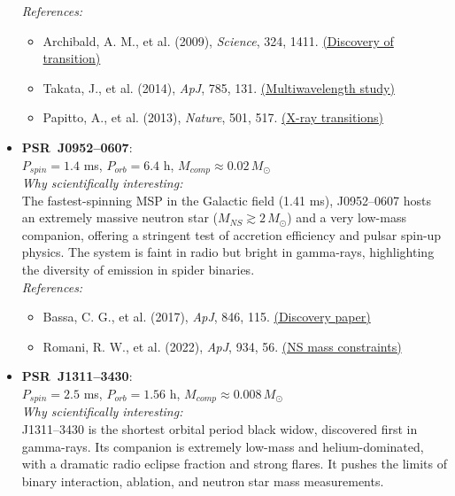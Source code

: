 \documentclass[12pt]{article}
\begin{document}
\begin{itemize}
    \textit{References:}
    \begin{itemize}
        \item Archibald, A. M., et al. (2009), \textit{Science}, 324, 1411. \href{https://www.science.org/doi/10.1126/science.1172740}{(Discovery of transition)}
        \item Takata, J., et al. (2014), \textit{ApJ}, 785, 131. \href{https://iopscience.iop.org/article/10.1088/0004-637X/785/2/131}{(Multiwavelength study)}
        \item Papitto, A., et al. (2013), \textit{Nature}, 501, 517. \href{https://www.nature.com/articles/nature12470}{(X-ray transitions)}
    \end{itemize}
    \vspace{0.5em}
    
    \item \textbf{PSR~J0952--0607}:\\
    $P_{spin}=1.4$ ms, $P_{orb}=6.4$ h, $M_{comp}\approx0.02\,M_\odot$\\
    
    \textit{Why scientifically interesting:}\\
    The fastest-spinning MSP in the Galactic field (1.41 ms), J0952--0607 hosts an extremely massive neutron star ($M_{NS} \gtrsim 2\,M_\odot$) and a very low-mass companion, offering a stringent test of accretion efficiency and pulsar spin-up physics. The system is faint in radio but bright in gamma-rays, highlighting the diversity of emission in spider binaries.\\
    
    \textit{References:}
    \begin{itemize}
        \item Bassa, C. G., et al. (2017), \textit{ApJ}, 846, 115. \href{https://iopscience.iop.org/article/10.3847/1538-4357/aa859c}{(Discovery paper)}
        \item Romani, R. W., et al. (2022), \textit{ApJ}, 934, 56. \href{https://iopscience.iop.org/article/10.3847/1538-4357/ac71e1}{(NS mass constraints)}
    \end{itemize}
    \vspace{0.5em}
    
    \item \textbf{PSR~J1311--3430}:\\
    $P_{spin}=2.5$ ms, $P_{orb}=1.56$ h, $M_{comp}\approx0.008\,M_\odot$\\
    
    \textit{Why scientifically interesting:}\\
    J1311--3430 is the shortest orbital period black widow, discovered first in gamma-rays. Its companion is extremely low-mass and helium-dominated, with a dramatic radio eclipse fraction and strong flares. It pushes the limits of binary interaction, ablation, and neutron star mass measurements.\\
    

\end{itemize}
\end{document}
